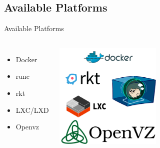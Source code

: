 \subsection{Available Platforms}
\begin{frame}[fragile]{Available Platforms}

\begin{columns}


\begin{itemize}
\item\color{cobalt} Docker
\item\color{cobalt} runc
\item\color{cobalt} rkt
\item\color{cobalt} LXC/LXD
\item\color{gray} Openvz
\end{itemize}
\begin{center}
 \includegraphics[height=2in]{images/platforms.PNG}
\end{center}
\end{columns}


%
\end{frame}
